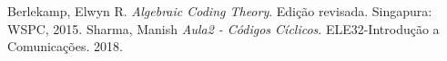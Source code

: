 \begin{thebibliography}{1}

Berlekamp, Elwyn R. \emph{Algebraic Coding Theory}. Edição revisada. Singapura: WSPC, 2015. 
Sharma, Manish \emph{Aula2 - Códigos Cíclicos}. ELE32-Introdução a Comunicações. 2018. 

\end{thebibliography}